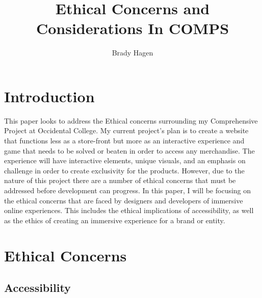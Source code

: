 \documentclass[10pt,twocolumn]{article}
\title{Ethical Concerns and Considerations In COMPS}
\author{Brady Hagen}
\affiliation{Occidental College}
\begin{document}
\maketitle

\section{Introduction}

This paper looks to address the Ethical concerns surrounding my Comprehensive Project at Occidental College. My current project’s plan is to create a website that functions less as a store-front but more as an interactive experience and game that needs to be solved or beaten in order to access any merchandise. The experience will have interactive elements, unique visuals, and an emphasis on challenge in order to create exclusivity for the products. However, due to the nature of this project there are a number of ethical concerns that must be addressed before development can progress. In this paper, I will be focusing on the ethical concerns that are faced by designers and developers of immersive online experiences. This includes the ethical implications of accessibility, as well as the ethics of creating an immersive experience for a brand or entity.

\section{Ethical Concerns}
\subsection{Accessibility}
\end{document}
